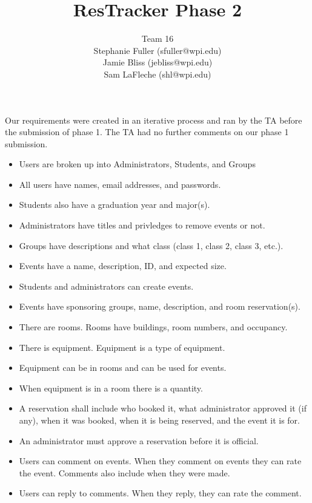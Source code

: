 \documentclass{article}
\title{ResTracker Phase 2}
\author{Team 16\\Stephanie Fuller (sfuller@wpi.edu)\\Jamie Bliss (jebliss@wpi.edu)\\Sam
LaFleche (shl@wpi.edu)}
\begin{document}

\maketitle


\section{}
Our requirements were created in an iterative process and ran by the TA before
the submission of phase 1. The TA had no further comments on our phase 1
submission. 

\begin{itemize}
\item Users are broken up into Administrators, Students, and Groups
\item All users have names, email addresses, and passwords.
\item Students also have a graduation year and major(s).
\item Administrators have titles and privledges to remove events or not. 
\item Groups have descriptions and what class (class 1, class 2, class 3, etc.).
\item Events have a name, description, ID, and expected size.
\item Students and administrators can create events.
\item Events have sponsoring groups, name, description, and room reservation(s).
\item There are rooms. Rooms have buildings, room numbers, and occupancy.
\item There is equipment. Equipment is a type of equipment.
\item Equipment can be in rooms and can be used for events.
\item When equipment is in a room there is a quantity.
\item A reservation shall include who booked it, what administrator
approved it (if any), when it was booked, when it is being reserved,
and the event it is for.
\item An administrator must approve a reservation before it is official.
\item Users can comment on events. When they comment on events they can rate the
event. Comments also include when they were made. 
\item Users can reply to comments. When they reply, they can rate the comment. 

\end{itemize}
\end{document}
